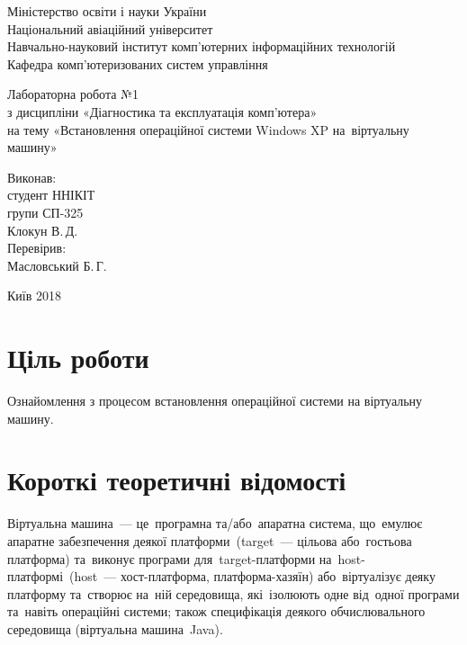 \documentclass[
	a4paper,
	oneside,
	DIV = 12,
	fontsize = 13pt,
	headings = normal,
]{scrartcl}
\newcommand{\allcaps}[1]{{\addfontfeatures{LetterSpace = 5}#1}}
\begin{document}
	\begin{titlepage}
		\begin{center}
			Міністерство освіти і науки України\\
			Національний авіаційний університет\\
			Навчально-науковий інститут комп'ютерних інформаційних технологій\\
			Кафедра комп'ютеризованих систем управління

			\vspace{\fill}
				Лабораторна робота №1\\
				з дисципліни «Діагностика та експлуатація комп'ютера»\\
				на тему «Встановлення операційної системи Windows XP на~віртуальну машину»\\

			\vspace{\fill}

			\begin{flushright}
				Виконав:\\
				студент \allcaps{ННІКІТ}\\
				групи СП-325\\
				Клокун В.\,Д.\\
				Перевірив:\\
				Масловський Б.\,Г.
			\end{flushright}

			Київ 2018
		\end{center}
	\end{titlepage}

	\section{Ціль роботи}
		Ознайомлення з процесом встановлення операційної системи на віртуальну машину.

	\section{Короткі теоретичні відомості}
		Віртуальна машина~— це~програмна та/або~апаратна система, що~емулює апаратне забезпечення деякої платформи~(target~— цільова або~гостьова платформа) та~виконує програми для~target-плат\-фор\-ми на~host-плат\-фор\-мі~(host~— хост-плат\-фор\-ма, плат\-фор\-ма-ха\-зя\-їн) або~віртуалізує деяку платформу та~створює на~ній середовища, які~ізолюють одне від~одної програми та~навіть операційні системи; також специфікація деякого обчислювального середовища (віртуальна машина~Java).
\end{document}
